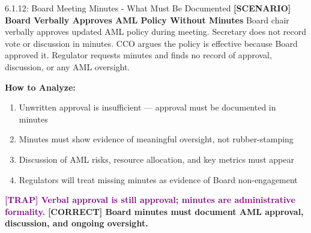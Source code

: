 \documentclass[11pt,a4paper]{beamer}
\newcommand{\trap}[1]{\textcolor{purple}{\textbf{[TRAP] #1}}}
\newcommand{\correct}[1]{\textcolor{green!50!black}{\textbf{[CORRECT] #1}}}
\newcommand{\scenario}[1]{\textcolor{blue!70!black}{\textbf{[SCENARIO] #1}}}
\begin{document}
\begin{frame}{6.1.12: Board Meeting Minutes - What Must Be Documented}
	\scenario{Board Verbally Approves AML Policy Without Minutes}
	Board chair verbally approves updated AML policy during meeting. Secretary does not record vote or discussion in minutes. CCO argues the policy is effective because Board approved it. Regulator requests minutes and finds no record of approval, discussion, or any AML oversight.
	
	\vspace{0.1cm}
	\textbf{How to Analyze:}
	\begin{enumerate}
		\item Unwritten approval is insufficient — approval must be documented in minutes
		\item Minutes must show evidence of meaningful oversight, not rubber-stamping
		\item Discussion of AML risks, resource allocation, and key metrics must appear
		\item Regulators will treat missing minutes as evidence of Board non-engagement
	\end{enumerate}
	\trap{Verbal approval is still approval; minutes are administrative formality.}
	\correct{Board minutes must document AML approval, discussion, and ongoing oversight.}
\end{frame}
\end{document}
